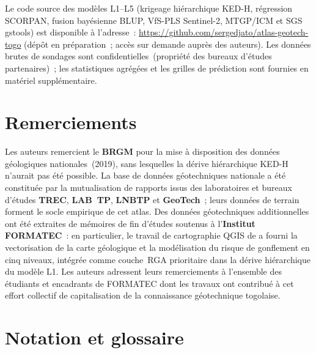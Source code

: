 \documentclass[10pt,a4paper,twocolumn]{article}
\begin{document}
	Le code source des modèles L1--L5 (krigeage hiérarchique KED-H,
	régression SCORPAN, fusion bayésienne BLUP, VfS-PLS Sentinel-2,
	MTGP/ICM et SGS gstools) est disponible à l'adresse~:
	\url{https://github.com/sergedjato/atlas-geotech-togo}
	(dépôt en préparation~; accès sur demande auprès des auteurs).
	Les données brutes de sondages sont confidentielles~(propriété des
	bureaux d'études partenaires)~; les statistiques agrégées et les
	grilles de prédiction sont fournies en matériel supplémentaire.

\section*{Remerciements}

	Les auteurs remercient le \textbf{BRGM} pour la mise à disposition
	des données géologiques nationales~(2019), sans lesquelles la
	dérive hiérarchique KED-H n'aurait pas été possible.
	La base de données géotechniques nationale a été constituée par la
	mutualisation de rapports issus des laboratoires et bureaux d'études
	\textbf{TREC}, \textbf{LAB~TP}, \textbf{LNBTP} et \textbf{GeoTech}~;
	leurs données de terrain forment le socle empirique de cet atlas.
	Des données géotechniques additionnelles ont été extraites de mémoires
	de fin d'études soutenus à l'\textbf{Institut FORMATEC}~: en particulier,
	le travail de cartographie QGIS de \textcite{bassafoula2025integration}
	a fourni la vectorisation de la carte géologique et la modélisation
	du risque de gonflement en cinq niveaux, intégrée comme couche~RGA
	prioritaire dans la dérive hiérarchique du modèle L1.
	Les auteurs adressent leurs remerciements à l'ensemble des étudiants
	et encadrants de FORMATEC dont les travaux ont contribué à cet effort
	collectif de capitalisation de la connaissance géotechnique togolaise.
	
	\printbibliography
	
	\appendix

	\section{Notation et glossaire}
	\label{app:notation}
	
\end{document}
